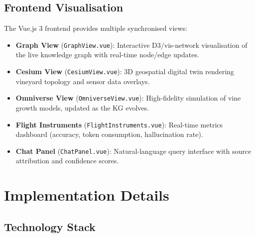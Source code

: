 \documentclass[12pt,a4paper]{article}
\begin{document}
\subsection{Frontend Visualisation}

The Vue.js 3 frontend provides multiple synchronised views:

\begin{itemize}
  \item \textbf{Graph View} (\texttt{GraphView.vue}): Interactive D3/vis-network
    visualisation of the live knowledge graph with real-time node/edge updates.
  \item \textbf{Cesium View} (\texttt{CesiumView.vue}): 3D geospatial digital
    twin rendering vineyard topology and sensor data overlays.
  \item \textbf{Omniverse View} (\texttt{OmniverseView.vue}): High-fidelity
    simulation of vine growth models, updated as the KG evolves.
  \item \textbf{Flight Instruments} (\texttt{FlightInstruments.vue}): Real-time
    metrics dashboard (accuracy, token consumption, hallucination rate).
  \item \textbf{Chat Panel} (\texttt{ChatPanel.vue}): Natural-language query
    interface with source attribution and confidence scores.
\end{itemize}

\section{Implementation Details}

\subsection{Technology Stack}
\end{document}
